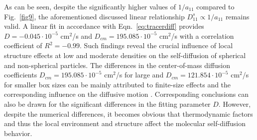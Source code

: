 \documentclass[aip,jcp,reprint]{revtex4-1}
\begin{document}
As can be seen, despite the significantly higher values of $1/a_{11}$ compared to Fig.~\ref{fig9},  the aforementioned discussed linear relationship $D_{11}^s \propto 1/a_{11}$ remains valid. A linear fit in accordance with Eqn.~\eqref{eq:tracerdiff} provides $D=-0.045\cdot 10^{-5}$ cm$^2$/s and $D_{cm}=195.085 \cdot 10^{-5}$ cm$^2$/s with a correlation coefficient  of $R^2 = -0.99$. Such findings reveal the crucial influence of local structure effects at low and moderate densities on the self-diffusion of spherical  and non-spherical particles. The differences in the center-of-mass diffusion coefficients $D_{cm}=195.085 \cdot 10^{-5}$ cm$^2$/s for large and $D_{cm}=121.854 \cdot 10^{-5}$  cm$^2$/s for smaller box sizes can be mainly attributed to finite-size effects and the corresponding influence on the diffusive motion \cite{yeh04a}. Corresponding conclusions can also be drawn for the significant differences in the fitting parameter $D$. However, despite the numerical differences, it becomes obvious that thermodynamic factors and thus the local environment and structure affect the molecular self-diffusion behavior.
\end{document}
